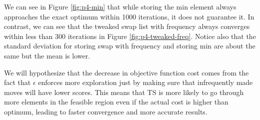 We can see in Figure \ref{fig:p4-min} that while storing the min element always approaches the exact optimum within 1000 iterations, it does not guarantee it. In contrast, we can see that the tweaked swap list with frequency always converges within less than 300 iterations in Figure \ref{fig:p4-tweaked-freq}. Notice also that the standard deviation for storing swap with frequency and storing min are about the same but the mean is lower.

We will hypothesize that the decrease in objective function cost comes from the fact that \(\epsilon\) enforces more exploration just by making sure that infrequently made moves will have lower scores. This means that TS is more likely to go through more elements in the feasible region even if the actual cost is higher than optimum, leading to faster convergence and more accurate results.
